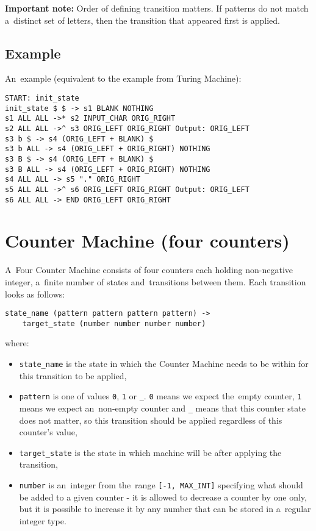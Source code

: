 \documentclass[english,shortabstract,mgr]{iithesis}
\begin{document}
\textbf{Important note:} Order of defining transition matters. If patterns do not match
a~distinct set of letters, then the transition that appeared first is applied.

\subsection{Example}

An~example (equivalent to the example from Turing Machine):
\begin{verbatim}
START: init_state
init_state $ $ -> s1 BLANK NOTHING
s1 ALL ALL ->* s2 INPUT_CHAR ORIG_RIGHT
s2 ALL ALL ->^ s3 ORIG_LEFT ORIG_RIGHT Output: ORIG_LEFT
s3 b $ -> s4 (ORIG_LEFT + BLANK) $
s3 b ALL -> s4 (ORIG_LEFT + ORIG_RIGHT) NOTHING
s3 B $ -> s4 (ORIG_LEFT + BLANK) $
s3 B ALL -> s4 (ORIG_LEFT + ORIG_RIGHT) NOTHING
s4 ALL ALL -> s5 "." ORIG_RIGHT
s5 ALL ALL ->^ s6 ORIG_LEFT ORIG_RIGHT Output: ORIG_LEFT
s6 ALL ALL -> END ORIG_LEFT ORIG_RIGHT
\end{verbatim}

\section {Counter Machine (four counters)}

A~Four Counter Machine consists of four counters each holding non-negative integer,
a~finite number of states and~transitions between them. Each transition
looks as follows:

\begin{verbatim}
state_name (pattern pattern pattern pattern) ->
    target_state (number number number number)
\end{verbatim}
%
where:
\begin{itemize}
  \item \texttt{state\_name} is the state in which the Counter Machine needs to be
      within for this transition to be applied,
  \item \texttt{pattern} is one of values \texttt{0}, \texttt{1} or \texttt{\_}.
      \texttt{0} means we expect the~empty counter, \texttt{1} means we expect an~non-empty
      counter and \texttt{\_} means that this counter state does not matter, so
      this transition should be applied regardless of this counter's value,
  \item \texttt{target\_state} is the state in which machine will be after
      applying the transition,
  \item \texttt{number} is an~integer from the~range \texttt{[-1, MAX\_INT]} specifying
      what should be added to a given counter - it is allowed to decrease a counter
      by one only, but it is possible to increase it by any number that can be stored
      in a~regular integer type.
\end{itemize}
\end{document}

